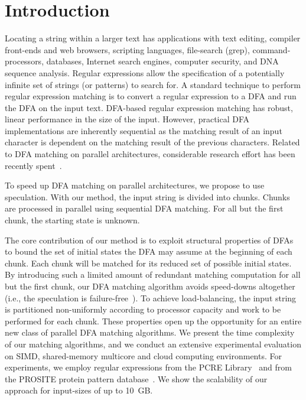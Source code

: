 \documentclass[smallextended]{svjour3}
\begin{document}
\section{Introduction}\label{sec:Introduction}
Locating a string within a larger text has applications
with text editing, compiler front-ends and web browsers,
scripting languages, file-search (grep), command-processors, databases,
Internet search engines, computer security, and DNA sequence analysis.
Regular expressions allow the specification of a potentially infinite
set of strings (or patterns) to search for.
A standard technique to perform regular expression matching is to
convert a regular expression to a DFA and run the DFA on
the input text. DFA-based regular expression matching has robust, linear
performance in the size of the input. However, practical DFA implementations
are inherently sequential as the matching result of an input character is 
dependent on 
the matching result of the previous characters.
Related to DFA matching on parallel architectures, considerable
research effort has been recently
spent~\cite{Luchaup2011,WangHL10,Holub:2009,Jones2009,Luchaup2009,ScarpazzaVP07}.

To speed up DFA matching on parallel architectures, we propose
to use speculation. With our method, the input string is divided
into chunks. Chunks are processed in parallel using sequential
DFA matching. For all but the first chunk, the starting state is unknown.

The core contribution of our method is to exploit structural properties
of DFAs to bound the set of initial states the DFA may assume
at the beginning of each chunk. Each chunk will be matched
for its reduced set of possible
initial states. By introducing such a limited amount
of redundant matching computation for all but the first chunk,
our DFA matching algorithm avoids speed-downs altogether (i.e.,
the speculation is failure-free~\cite{Specpar}). To achieve load-balancing,
the input string is partitioned
non-uniformly according to processor
capacity and work to be performed for each chunk.
These properties open up the opportunity for an entire new class
of parallel DFA matching algorithms. 
We present the time complexity of our matching algorithms,
and we conduct an extensive experimental evaluation
on SIMD, shared-memory multicore and cloud computing environments.
For experiments, we employ regular expressions from 
the PCRE Library~\cite{PCRELib} and from the
PROSITE protein pattern database~\cite{PROSITE}.
We show the scalability of our approach for input-sizes of
up to \SI{10}{GB}.
\end{document}
